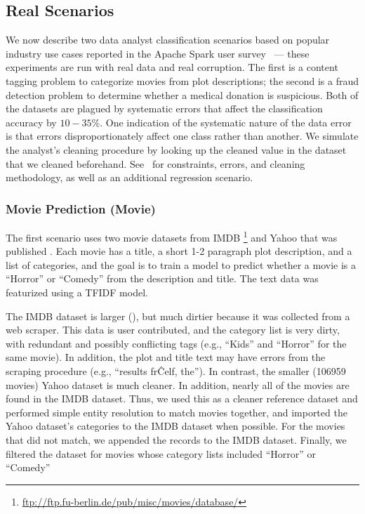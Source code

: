 \subsection{Real Scenarios}\label{real-errors}
We now describe two data analyst classification scenarios based on popular industry use cases reported in the Apache Spark user survey~\cite{sparksurvey} --- these experiments are run with real data and real corruption.
The first is a content tagging problem to categorize movies from plot descriptions; 
the second is a fraud detection problem to  determine whether a medical donation is suspicious.
Both of the datasets are plagued by systematic errors that affect the classification accuracy by $10-35\%$.
One indication of the systematic nature of the data error is that errors disproportionately affect one class rather than another.
We simulate the analyst's cleaning procedure by looking up the cleaned value in the dataset that we cleaned beforehand.
See~\cite{activecleanarxiv} for constraints, errors, and cleaning methodology, as well as an additional regression scenario.


\subsubsection{Movie Prediction (Movie)}
The first scenario uses two movie datasets from IMDB \footnote{\tiny \url{ftp://ftp.fu-berlin.de/pub/misc/movies/database/}} and Yahoo that was published .
Each movie has a title, a short 1-2 paragraph plot description, and a list of categories, and the goal is to train a model to predict whether a movie is a ``Horror'' or ``Comedy'' from the description and title.  The text data was featurized using a TFIDF model.

The IMDB dataset is larger (), but much dirtier because it was collected from a web scraper.  
This data is user contributed, and the category list is very dirty, with redundant and possibly conflicting tags (e.g., ``Kids'' and ``Horror'' for the same movie).  
In addition, the plot and title text may have errors from the scraping procedure (e.g., ``results fr\^Celf, the'').
In contrast, the smaller (106959 movies) Yahoo dataset is much cleaner.  In addition, nearly all of the movies are found in the IMDB dataset.
Thus, we used this as a cleaner reference dataset and performed simple entity resolution to match movies together, and imported the Yahoo dataset's categories to the IMDB dataset when possible.
For the movies that did not match, we appended the records to the IMDB dataset.
Finally, we filtered the dataset for movies whose category lists included ``Horror'' or ``Comedy''


